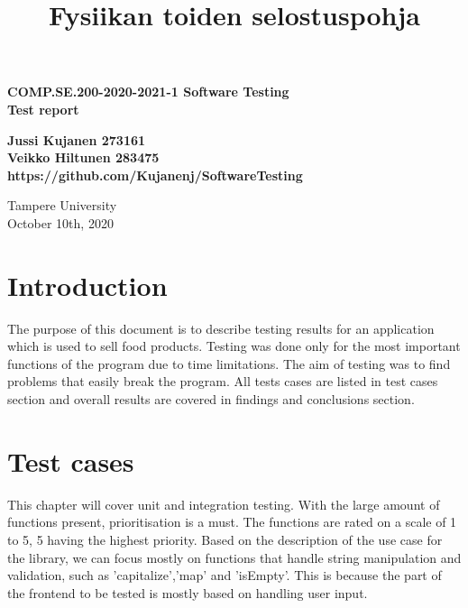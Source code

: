 \documentclass[a4paper, 12pt]{article}
\title{Fysiikan toiden selostuspohja}
\begin{document}
\begin{titlepage}
    \begin{center}
        \vspace*{1cm}
 
        \textbf{COMP.SE.200-2020-2021-1 Software Testing}
        \\
        \textbf{Test report}
 
        \vspace{0.5cm}
       
             
        \vspace{1.5cm}

        \textbf{Jussi Kujanen 273161}
        \\
        \textbf{Veikko Hiltunen 283475}
        \\
        \textbf{https://github.com/Kujanenj/SoftwareTesting}
 
        \vfill
        \vspace{0.8cm}
        Tampere University\\
        October 10th, 2020
    \end{center}
 \end{titlepage} 



\newpage
\thispagestyle{empty}
\tableofcontents

\newpage
\clearpage
{} 

\section{Introduction}

The purpose of this document is to describe testing results for an application which is used to sell food products. Testing was done only for the most important functions of the program due to time limitations. The aim of testing was to find problems that easily break the program. All tests cases are listed in test cases section and overall results are covered in findings and conclusions section.

\section{Test cases}
This chapter will cover unit and integration testing. With the large amount of functions present, prioritisation is a must. The functions are rated on a scale of 1 to 5, 5 having the highest priority.
Based on the description of the use case for the library, we can focus mostly on functions that handle string manipulation and validation,
such as 'capitalize','map' and 'isEmpty'. This is because the part of the frontend to be tested  is mostly based on handling user input.
\\\\
\end{document}

